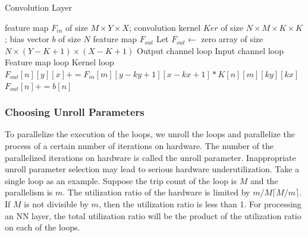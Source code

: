 \begin{algorithm}  
    \caption{Convolution Layer}
    \label{alg:conv}
    \begin{algorithmic}[1]
        \Require feature map $F_{in}$ of size $M\times Y\times X$; 
                 convolution kernel $Ker$ of size $N\times M\times K\times K$;
                 bias vector $b$ of size $N$ 
        \Ensure  feature map $F_{out}$
            \State Let $F_{out} \gets $ zero array of size $N\times(Y-K+1)\times(X-K+1)$  
             \Comment Output channel loop
                 \Comment Input channel loop
                     \Comment Feature map loop
                         \Comment Kernel loop
                            \State $F_{out}[n][y][x] += F_{in}[m][y-ky+1][x-kx+1] * K[n][m][ky][kx]$
                        \EndFor
                    \EndFor
                \EndFor
                \State $F_{out}[n] += b[n]$
            \EndFor
            \State {}
        \EndFunction  
        
    \end{algorithmic}  
\end{algorithm}

\subsubsection{Choosing Unroll Parameters}

To parallelize the execution of the loops, we unroll the loops and parallelize the process of a certain number of iterations on hardware. The number of the parallelized iterations on hardware is called the unroll parameter. Inappropriate unroll parameter selection may lead to serious hardware underutilization. Take a single loop as an example. Suppose the trip count of the loop is $M$ and the parallelism is $m$. The utilization ratio of the hardware is limited by $m/M\lceil M/m\rceil$. If $M$ is not divisible by $m$, then the utilization ratio is less than 1. For processing an NN layer, the total utilization ratio will be the product of the utilization ratio on each of the loops.


